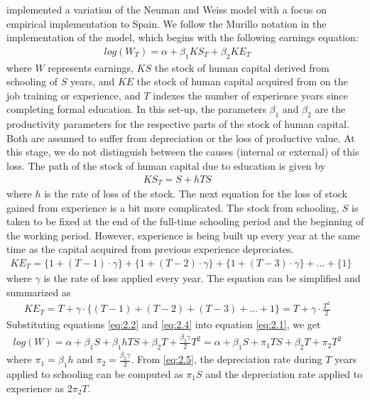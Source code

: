 \documentclass[alpha-refs]{wiley-article-02b}
\begin{document}
\citet{Murillo_2006} implemented a variation of the Neuman and Weiss model with a focus on empirical implementation to Spain. We follow the Murillo notation in the implementation of the model, which begins with the following earnings equation: 
\begin{align*}\label{eq:2.1} 
log(W_{T}) = \alpha + \beta_{1}KS_{T} +  \beta_{2}KE_{T} &&
\end{align*}
\noindent
where $W$ represents earnings, $KS$ the stock of human capital derived from schooling of $S$ years, and $KE$ the stock of human capital acquired from on the job training or experience, and $T$ indexes the number of experience years since completing formal education. In this set-up, the parameters $\beta_1$ and $\beta_2$ are the productivity parameters for the respective parts of the stock of human capital. Both are assumed to suffer from depreciation or the loss of productive value. At this stage, we do not distinguish between the causes (internal or external) of this loss. The path of the stock of human capital due to education is given by 
\begin{align*}\label{eq:2.2} 
KS_{T} = S + hTS &&
\end{align*} 
\noindent
where $h$ is the rate of loss of the stock. The next equation for the loss of stock gained from experience is a bit more complicated. The stock from schooling, $S$ is taken to be fixed at the end of the full-time schooling period and the beginning of the working period. However, experience is being built up every year at the same time as the capital acquired from previous experience depreciates. 
\begin{align*}\label{eq:2.3} 
KE_{T} = \{1 + (T-1)\cdot\gamma \} + \{1 + (T-2)\cdot\gamma \}  + \{1 + (T-3)\cdot\gamma \} + \ldots + \{1\}  && 
\end{align*} 
\noindent
where $\gamma$ is the rate of loss applied every year. The equation can be simplified and summarized as
\begin{align*}\label{eq:2.4} 
KE_{T} =  T + \gamma\cdot\{(T-1) + (T-2) + (T-3) + \ldots + 1\} = T + \gamma\cdot\frac{T^2}{2}   && 
\end{align*} 
Substituting equations \ref{eq:2.2} and \ref{eq:2.4} into equation \ref{eq:2.1}, we get
\begin{align*}\label{eq:2.5} 
log(W) = \alpha +  \beta_{1}S +  \beta_{1}hTS + \beta_{2}T + \frac{\beta_{2}\gamma}{2}T^{2} =  \alpha +  \beta_{1}S + \pi_{1}TS + \beta_{2}T + \pi_{2}T^{2} && 
\end{align*} 
\noindent
where $\pi_{1} = \beta_{1}h$ and $\pi_{2} = \frac{\beta_{2}\gamma}{2}$. 
\vspace{2pt}
\noindent
From \ref{eq:2.5}, the depreciation rate during $T$ years applied to 
schooling can be computed as $\pi_{1}S $ and the depreciation rate applied 
to experience as $ 2\pi_{2}T$.
\vspace{-5pt}
\end{document}
